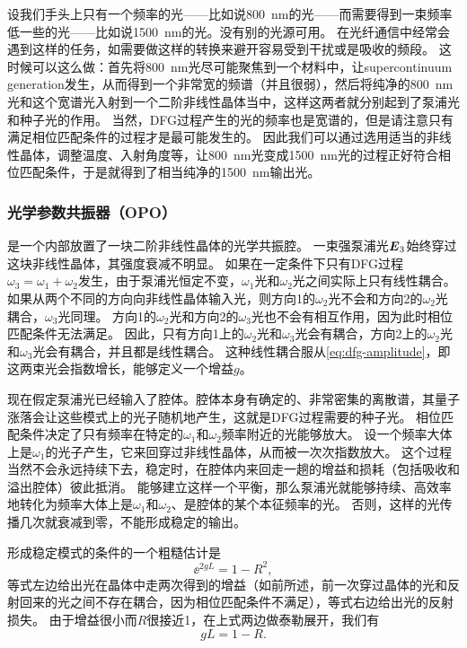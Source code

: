 设我们手头上只有一个频率的光——比如说\SI{800}{nm}的光——而需要得到一束频率低一些的光——比如说\SI{1500}{nm}的光。没有别的光源可用。
在光纤通信中经常会遇到这样的任务，如需要做这样的转换来避开容易受到干扰或是吸收的频段。
这时候可以这么做：首先将\SI{800}{nm}光尽可能聚焦到一个材料中，让supercontinuum generation发生，从而得到一个非常宽的频谱（并且很弱），然后将纯净的\SI{800}{nm}光和这个宽谱光入射到一个二阶非线性晶体当中，这样这两者就分别起到了泵浦光和种子光的作用。
当然，DFG过程产生的光的频率也是宽谱的，但是请注意只有满足相位匹配条件的过程才是最可能发生的。
因此我们可以通过选用适当的非线性晶体，调整温度、入射角度等，让\SI{800}{nm}光变成\SI{1500}{nm}光的过程正好符合相位匹配条件，于是就得到了相当纯净的\SI{1500}{nm}输出光。

\subsubsection{光学参数共振器（OPO）}\label{sec:opo}

是一个内部放置了一块二阶非线性晶体的光学共振腔。
一束强泵浦光$\vb*{E}_3$始终穿过这块非线性晶体，其强度衰减不明显。
如果在一定条件下只有DFG过程$\omega_3 = \omega_1 + \omega_2$发生，由于泵浦光恒定不变，$\omega_1$光和$\omega_2$光之间实际上只有线性耦合。
如果从两个不同的方向向非线性晶体输入光，则方向1的$\omega_2$光不会和方向2的$\omega_2$光耦合，$\omega_3$光同理。
方向1的$\omega_2$光和方向2的$\omega_3$光也不会有相互作用，因为此时相位匹配条件无法满足。
因此，只有方向1上的$\omega_2$光和$\omega_3$光会有耦合，方向2上的$\omega_2$光和$\omega_3$光会有耦合，并且都是线性耦合。
这种线性耦合服从\eqref{eq:dfg-amplitude}，即这两束光会指数增长，能够定义一个增益$g$。

现在假定泵浦光已经输入了腔体。腔体本身有确定的、非常密集的离散谱，其量子涨落会让这些模式上的光子随机地产生，这就是DFG过程需要的种子光。
相位匹配条件决定了只有频率在特定的$\omega_1$和$\omega_2$频率附近的光能够放大。
设一个频率大体上是$\omega_1$的光子产生，它来回穿过非线性晶体，从而被一次次指数放大。
这个过程当然不会永远持续下去，稳定时，在腔体内来回走一趟的增益和损耗（包括吸收和溢出腔体）彼此抵消。
能够建立这样一个平衡，那么泵浦光就能够持续、高效率地转化为频率大体上是$\omega_1$和$\omega_2$、是腔体的某个本征频率的光。
否则，这样的光传播几次就衰减到零，不能形成稳定的输出。

形成稳定模式的条件的一个粗糙估计是
\begin{equation}
    \ee^{2 g L} = 1 - R^2,
\end{equation}
等式左边给出光在晶体中走两次得到的增益（如前所述，前一次穿过晶体的光和反射回来的光之间不存在耦合，因为相位匹配条件不满足），等式右边给出光的反射损失。
由于增益很小而$R$很接近1，在上式两边做泰勒展开，我们有
\begin{equation}
    g L = 1 - R.
\end{equation}


